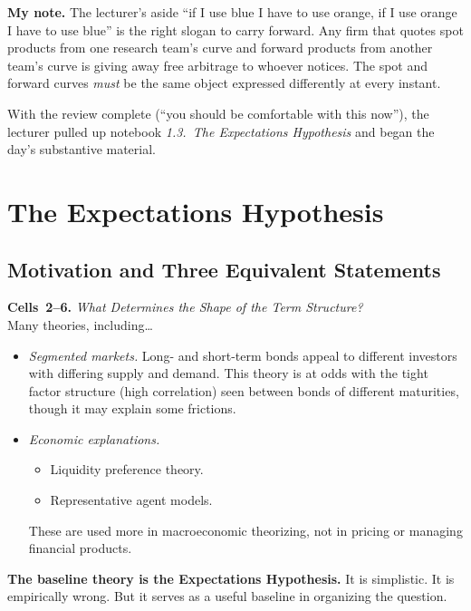 \begin{checkpoint}
\textbf{My note.} The lecturer's aside ``if I use blue I have to use orange,
if I use orange I have to use blue'' is the right slogan to carry forward.
Any firm that quotes spot products from one research team's curve and
forward products from another team's curve is giving away free arbitrage
to whoever notices. The spot and forward curves \emph{must} be the same
object expressed differently at every instant.
\end{checkpoint}

With the review complete (``you should be comfortable with this now''), the
lecturer pulled up notebook \emph{1.3.~The Expectations Hypothesis} and began
the day's substantive material.

\section{The Expectations Hypothesis}\label{L2-sec:EH}

\subsection{Motivation and Three Equivalent Statements}\label{L2-sec:EH-forms}

\begin{keyblock}
\textbf{Cells~2--6.} \emph{What Determines the Shape of the Term Structure?}\\
Many theories, including\dots
\begin{itemize}
  \item \emph{Segmented markets.} Long- and short-term bonds appeal to
        different investors with differing supply and demand. This theory is
        at odds with the tight factor structure (high correlation) seen
        between bonds of different maturities, though it may explain some
        frictions.
  \item \emph{Economic explanations.}
        \begin{itemize}
           \item Liquidity preference theory.
           \item Representative agent models.
        \end{itemize}
        These are used more in macroeconomic theorizing, not in pricing or
        managing financial products.
\end{itemize}

\textbf{The baseline theory is the Expectations Hypothesis.} It is simplistic.
It is empirically wrong. But it serves as a useful baseline in organizing the
question.
\end{keyblock}

